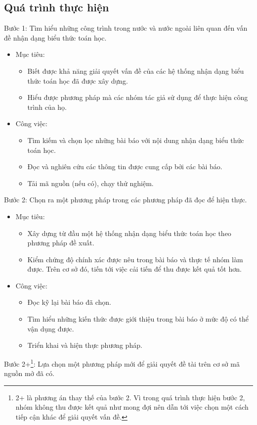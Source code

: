 \documentclass[a4paper]{article}
\theoremstyle{definition}
\begin{document}
	\subsection{Quá trình thực hiện}
	Bước 1: Tìm hiểu những công trình trong nước và nước ngoài liên quan đến vấn đề nhận dạng biểu thức toán học.
	\begin{itemize}
		\item Mục tiêu: 
		\begin{itemize}
			\item Biết được khả năng giải quyết vấn đề của các hệ thống nhận dạng biểu thức toán học đã được xây dựng.
			\item Hiểu được phương pháp mà các nhóm tác giả sử dụng để thực hiện công trình của họ.
		\end{itemize}
		\item Công việc: 
		\begin{itemize}
			\item Tìm kiếm và chọn lọc những bài báo với nội dung nhận dạng biểu thức toán học.
			\item Đọc và nghiên cứu các thông tin được cung cấp bởi các bài báo.
			\item Tải mã nguồn (nếu có), chạy thử nghiệm.
		\end{itemize}
	\end{itemize}
	Bước 2: Chọn ra một phương pháp trong các phương pháp đã đọc để hiện thực.\\
	\begin{itemize}
		\item Mục tiêu: 
		\begin{itemize}
			\item Xây dựng từ đầu một hệ thống nhận dạng biểu thức toán học theo phương pháp đề xuất.
			\item Kiểm chứng độ chính xác được nêu trong bài báo và thực tế nhóm làm được. Trên cơ sở đó, tiến tới việc cải tiến để thu được kết quả tốt hơn.
		\end{itemize}
		\item Công việc:
		\begin{itemize}
			\item Đọc kỹ lại bài báo đã chọn.
			\item Tìm hiểu những kiến thức được giới thiệu trong bài báo ở mức độ có thể vận dụng được.
			\item Triển khai và hiện thực phương pháp.
		\end{itemize}	
	\end{itemize}
	Bước 2+\footnote{2+ là phương án thay thế của bước 2. Vì trong quá trình thực hiện bước 2, nhóm không thu được kết quả như mong đợi nên dẫn tới việc chọn một cách tiếp cận khác để giải quyết vấn đề.}: Lựa chọn một phương pháp mới để giải quyết đề tài trên cơ sở mã nguồn mở đã có.
	
\end{document}
